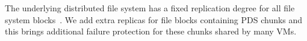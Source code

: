\begin{itemize}



\end{itemize}
The underlying distributed  file system has  a fixed replication degree for 
all file system blocks~\cite{googlefs03,hdfs10}.
We add extra replicas for file blocks containing PDS chunks  
and this brings additional  failure protection for these chunks shared by many VMs.


